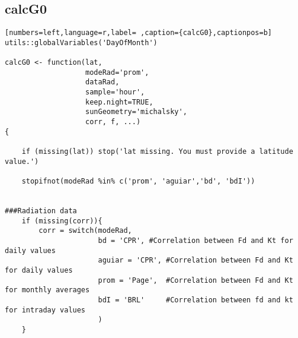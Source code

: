 \subsection{calcG0}
\label{sec:org78c9bf2}
\label{subsec:calcg0}
\begin{lstlisting}[numbers=left,language=r,label= ,caption={calcG0},captionpos=b]
utils::globalVariables('DayOfMonth')

calcG0 <- function(lat,
                   modeRad='prom',
                   dataRad,
                   sample='hour',
                   keep.night=TRUE,
                   sunGeometry='michalsky',
                   corr, f, ...)
{

    if (missing(lat)) stop('lat missing. You must provide a latitude value.')

    stopifnot(modeRad %in% c('prom', 'aguiar','bd', 'bdI'))


###Radiation data
    if (missing(corr)){
        corr = switch(modeRad,
                      bd = 'CPR', #Correlation between Fd and Kt for daily values
                      aguiar = 'CPR', #Correlation between Fd and Kt for daily values
                      prom = 'Page',  #Correlation between Fd and Kt for monthly averages
                      bdI = 'BRL'     #Correlation between fd and kt for intraday values
                      )
    }


\end{lstlisting}
